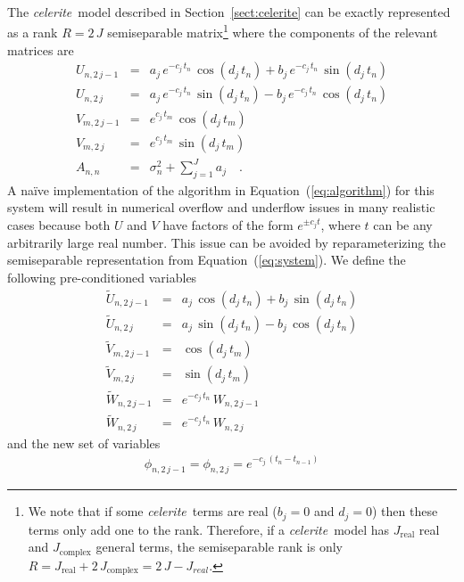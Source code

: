 \documentclass[manuscript, letterpaper]{aastex6}
\newcommand{\celeriteterm}{\emph{celerite}}
\renewcommand{\eqref}[1]{\ref{eq:#1}}
\newcommand{\Eq}[1]{Equation~(\eqref{#1})}
\newcommand{\eq}[1]{\Eq{#1}}
\newcommand{\eqlabel}[1]{\label{eq:#1}}
\newcommand{\sectionname}{Section}
\newcommand{\sectref}[1]{\ref{sect:#1}}
\newcommand{\Sect}[1]{\sectionname~\sectref{#1}}
\newcommand{\sect}[1]{\Sect{#1}}
\begin{document}
{The \celeriteterm\ model described in \sect{celerite} can be exactly
represented as a rank $R = 2\,J$ semiseparable matrix\footnote{We note that if
some \celeriteterm\ terms are real ($b_j=0$ and $d_j=0$) then these terms only
add one to the rank.
Therefore, if a \celeriteterm\ model has $J_\mathrm{real}$ real and
$J_\mathrm{complex}$ general terms, the semiseparable rank is only
$R=J_\mathrm{real} + 2\,J_\mathrm{complex}=2\,J-J_{real}$.}
where the components of the relevant matrices are
\begin{eqnarray}\eqlabel{system}
    U_{n,2\,j-1} &=& a_j\,e^{-c_j\,t_n}\,\cos(d_j\,t_n) +
    b_j\,e^{-c_j\,t_n}\,\sin(d_j\,t_n) \nonumber\\
    U_{n,2\,j} &=& a_j\,e^{-c_j\,t_n}\,\sin(d_j\,t_n) -
    b_j\,e^{-c_j\,t_n}\,\cos(d_j\,t_n) \nonumber\\
    V_{m,2\,j-1} &=& e^{c_j\,t_m}\,\cos(d_j\,t_m) \nonumber\\
    V_{m,2\,j} &=& e^{c_j\,t_m}\,\sin(d_j\,t_m) \nonumber\\
    A_{n,n} &=& \sigma_n^2 + \sum_{j=1}^J a_j \quad.
\end{eqnarray}
A na\"ive implementation of the algorithm in \eq{algorithm} for this system
will result in numerical overflow and underflow issues in many realistic cases
because both $U$ and $V$ have factors of the form $e^{\pm c_j t}$, where $t$
can be any arbitrarily large real number.
This issue can be avoided by reparameterizing the semiseparable representation
from \eq{system}.
We define the following pre-conditioned variables
\begin{eqnarray}\eqlabel{reparam}
    \tilde{U}_{n,2\,j-1} &=& a_j\,\cos(d_j\,t_n) + b_j\,\sin(d_j\,t_n) \nonumber\\
    \tilde{U}_{n,2\,j} &=& a_j\,\sin(d_j\,t_n) - b_j\,\cos(d_j\,t_n) \nonumber\\
    \tilde{V}_{m,2\,j-1} &=& \cos(d_j\,t_m) \nonumber\\
    \tilde{V}_{m,2\,j} &=& \sin(d_j\,t_m) \nonumber\\
    \tilde{W}_{n,2\,j-1} &=& e^{-c_j\,t_n}\,W_{n,2\,j-1} \nonumber\\
    \tilde{W}_{n,2\,j} &=& e^{-c_j\,t_n}\,W_{n,2\,j}
\end{eqnarray}
and the new set of variables
\begin{eqnarray}
    \phi_{n,2\,j-1} = \phi_{n,2\,j} = e^{-c_j\,(t_n - t_{n-1})}
\end{eqnarray}
}
\end{document}

